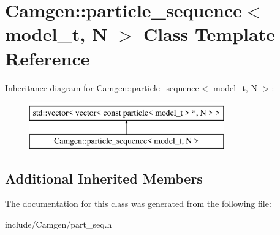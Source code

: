\hypertarget{a00405}{\section{Camgen\-:\-:particle\-\_\-sequence$<$ model\-\_\-t, N $>$ Class Template Reference}
\label{a00405}
}
Inheritance diagram for Camgen\-:\-:particle\-\_\-sequence$<$ model\-\_\-t, N $>$\-:\begin{figure}[H]
\begin{center}
\leavevmode
\includegraphics[height=2.000000cm]{a00405}
\end{center}
\end{figure}
\subsection*{Additional Inherited Members}


The documentation for this class was generated from the following file\-:\begin{DoxyCompactItemize}
\item 
include/\-Camgen/part\-\_\-seq.\-h\end{DoxyCompactItemize}
